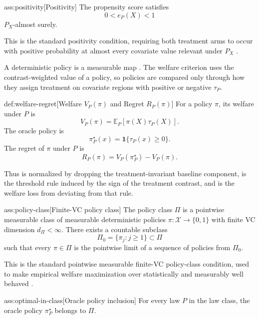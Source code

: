 \begin{assumptionv}{ass:positivity}[Positivity]
The propensity score satisfies
\[
0<e_P(X)<1
\]
\(P_X\)-almost surely.
\end{assumptionv}

This is the standard positivity condition, requiring both treatment arms to occur with positive probability at almost every covariate value relevant under \(P_X\) \citep{Imbens2015}.

A deterministic policy is a measurable map .  The welfare criterion uses the contrast-weighted value of a policy, so policies are compared only through how they assign treatment on covariate regions with positive or negative \(\tau_P\).

\begin{definitionv}{def:welfare-regret}[Welfare \(V_P(\pi)\) and Regret \(R_P(\pi)\)]
For a policy \(\pi\), its welfare under \(P\) is
\[
V_P(\pi)=\mathbb E_P\!\left[\pi(X)\tau_P(X)\right].
\]
The oracle policy is
\[
\pi^\star_P(x)=\mathbf 1\{\tau_P(x)\ge 0\}.
\]
The regret of \(\pi\) under \(P\) is
\[
R_P(\pi)=V_P(\pi^\star_P)-V_P(\pi).
\]
\end{definitionv}

Thus  is normalized by dropping the treatment-invariant baseline component,  is the threshold rule induced by the sign of the treatment contrast, and  is the welfare loss from deviating from that rule.

\begin{assumptionv}{ass:policy-class}[Finite-VC policy class]
The policy class \(\Pi\) is a pointwise measurable class of measurable deterministic policies \(\pi:\mathcal X\to\{0,1\}\) with finite VC dimension \(d_\Pi<\infty\).  There exists a countable subclass
\[
\Pi_0=\{\pi_j:j\ge 1\}\subset\Pi
\]
such that every \(\pi\in\Pi\) is the pointwise limit of a sequence of policies from \(\Pi_0\).
\end{assumptionv}

This is the standard pointwise measurable finite-VC policy-class condition, used to make empirical welfare maximization over  statistically and measurably well behaved \citep{Kitagawa2018}.

\begin{assumptionv}{ass:optimal-in-class}[Oracle policy inclusion]
For every law \(P\) in the law class, the oracle policy \(\pi^\star_P\) belongs to \(\Pi\).
\end{assumptionv}

